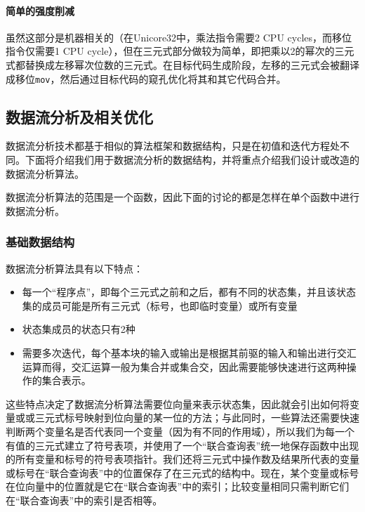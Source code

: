 \paragraph*{简单的强度削减} 虽然这部分是机器相关的（在Unicore32中，乘法指令需要2 CPU cycles，而移位指令仅需要1 CPU cycle），但在三元式部分做较为简单，即把乘以2的幂次的三元式都替换成左移幂次位数的三元式。在目标代码生成阶段，左移的三元式会被翻译成移位\verb|mov|，然后通过目标代码的窥孔优化将其和其它代码合并。

\subsection{数据流分析及相关优化}
\label{dataflow}
数据流分析技术都基于相似的算法框架和数据结构，只是在初值和迭代方程处不同。下面将介绍我们用于数据流分析的数据结构，并将重点介绍我们设计或改造的数据流分析算法。

数据流分析算法的范围是一个函数，因此下面的讨论的都是怎样在单个函数中进行数据流分析。

\subsubsection{基础数据结构}
\label{jointtable}
数据流分析算法具有以下特点：
\begin{itemize}
	\item 每一个“程序点”，即每个三元式之前和之后，都有不同的状态集，并且该状态集的成员可能是所有三元式（标号，也即临时变量）或所有变量
	\item 状态集成员的状态只有2种
	\item 需要多次迭代，每个基本块的输入或输出是根据其前驱的输入和输出进行交汇运算而得，交汇运算一般为集合并或集合交，因此需要能够快速进行这两种操作的集合表示。 
\end{itemize}
这些特点决定了数据流分析算法需要位向量来表示状态集，因此就会引出如何将变量或或三元式标号映射到位向量的某一位的方法；与此同时，一些算法还需要快速判断两个变量名是否代表同一个变量（因为有不同的作用域），所以我们为每一个有值的三元式建立了符号表项，并使用了一个“联合查询表”统一地保存函数中出现的所有变量和标号的符号表项指针。我们还将三元式中操作数及结果所代表的变量或标号在“联合查询表”中的位置保存了在三元式的结构中。现在，某个变量或标号在位向量中的位置就是它在“联合查询表”中的索引；比较变量相同只需判断它们在“联合查询表”中的索引是否相等。


